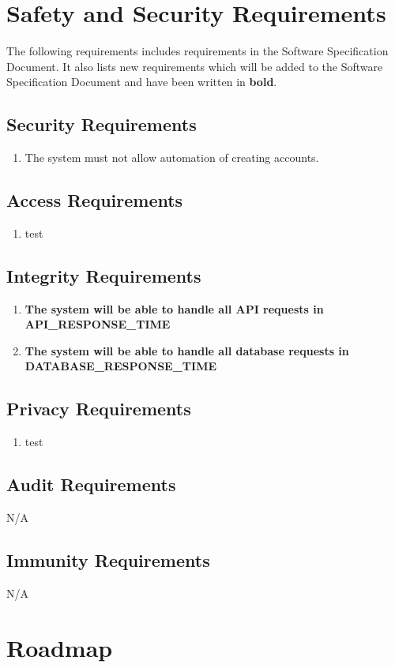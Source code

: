 \documentclass{article}
\begin{document}
\section{Safety and Security Requirements}

The following requirements includes requirements in the Software Specification Document. It also lists new requirements which will be added to the Software Specification Document and have been written in \textbf{bold}. 
\subsection{Security Requirements}
\begin{enumerate}[{SR}1. ]
    \item The system must not allow automation of creating accounts. 
\end{enumerate}
\subsection{Access Requirements}
\begin{enumerate}[{ACR}1. ]
    \item test
\end{enumerate}
\subsection{Integrity Requirements}
\begin{enumerate}[{IR}1. ]
    \item \textbf{The system will be able to handle all API requests in API\_RESPONSE\_TIME}
    \item \textbf{The system will be able to handle all database requests in DATABASE\_RESPONSE\_TIME}
\end{enumerate}
\subsection{Privacy Requirements}
\begin{enumerate}[{PR}1.]
    \item test
\end{enumerate}

\subsection{Audit Requirements}
N/A
\subsection{Immunity Requirements}
N/A
\section{Roadmap}

\end{document}
